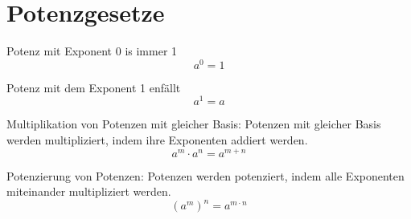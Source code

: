 \documentclass[11pt]{article}
\begin{document}
\section{Potenzgesetze}


Potenz mit Exponent 0 is immer 1
$$ a^{0} = 1 $$

Potenz mit dem Exponent 1 enfällt
$$ a^{1} = a $$ 

Multiplikation von Potenzen mit gleicher Basis: Potenzen mit gleicher Basis werden multipliziert, indem ihre Exponenten addiert werden.
$$ a^{m} \cdot a^{n} = a^{m+n} $$

Potenzierung von Potenzen: Potenzen werden potenziert, indem alle Exponenten miteinander multipliziert werden.
$$ (a^{m})^{n} = a^{m \cdot n} $$
\end{document}
